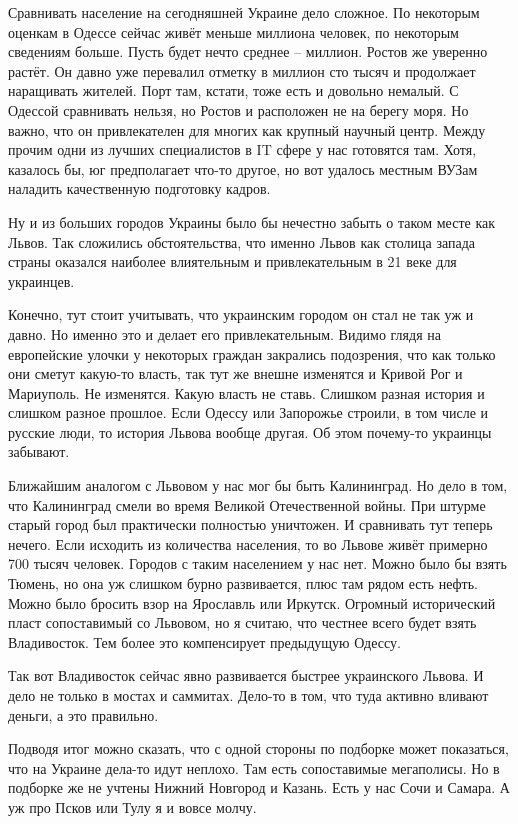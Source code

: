 Сравнивать население на сегодняшней Украине дело сложное. По некоторым оценкам
в Одессе сейчас живёт меньше миллиона человек, по некоторым сведениям больше.
Пусть будет нечто среднее – миллион. Ростов же уверенно растёт. Он давно уже
перевалил отметку в миллион сто тысяч и продолжает наращивать жителей. Порт
там, кстати, тоже есть и довольно немалый. С Одессой сравнивать нельзя, но
Ростов и расположен не на берегу моря. Но важно, что он привлекателен для
многих как крупный научный центр. Между прочим одни из лучших специалистов в IT
сфере у нас готовятся там. Хотя, казалось бы, юг предполагает что-то другое, но
вот удалось местным ВУЗам наладить качественную подготовку кадров.

Ну и из больших городов Украины было бы нечестно забыть о таком месте как
Львов. Так сложились обстоятельства, что именно Львов как столица запада страны
оказался наиболее влиятельным и привлекательным в 21 веке для украинцев.

Конечно, тут стоит учитывать, что украинским городом он стал не так уж и давно.
Но именно это и делает его привлекательным. Видимо глядя на европейские улочки
у некоторых граждан закрались подозрения, что как только они сметут какую-то
власть, так тут же внешне изменятся и Кривой Рог и Мариуполь. Не изменятся.
Какую власть не ставь. Слишком разная история и слишком разное прошлое. Если
Одессу или Запорожье строили, в том числе и русские люди, то история Львова
вообще другая. Об этом почему-то украинцы забывают.


Ближайшим аналогом с Львовом у нас мог бы быть Калининград. Но дело в том, что
Калининград смели во время Великой Отечественной войны. При штурме старый город
был практически полностью уничтожен. И сравнивать тут теперь нечего. Если
исходить из количества населения, то во Львове живёт примерно 700 тысяч
человек. Городов с таким населением у нас нет. Можно было бы взять Тюмень, но
она уж слишком бурно развивается, плюс там рядом есть нефть. Можно было бросить
взор на Ярославль или Иркутск. Огромный исторический пласт сопоставимый со
Львовом, но я считаю, что честнее всего будет взять Владивосток. Тем более это
компенсирует предыдущую Одессу.

Так вот Владивосток сейчас явно развивается быстрее украинского Львова. И дело
не только в мостах и саммитах. Дело-то в том, что туда активно вливают деньги,
а это правильно.

Подводя итог можно сказать, что с одной стороны по подборке может показаться,
что на Украине дела-то идут неплохо. Там есть сопоставимые мегаполисы. Но в
подборке же не учтены Нижний Новгород и Казань. Есть у нас Сочи и Самара. А уж
про Псков или Тулу я и вовсе молчу.

